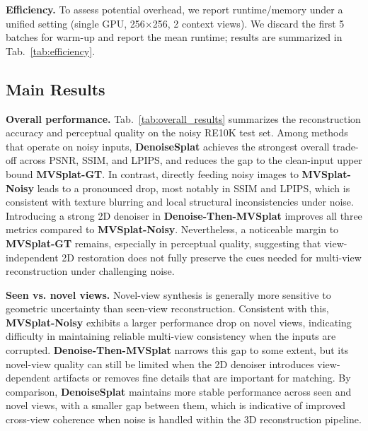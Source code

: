\noindent \textbf{Efficiency.}
To assess potential overhead, we report runtime/memory under a unified setting (single GPU, 256$\times$256, 2 context views).
We discard the first 5 batches for warm-up and report the mean runtime; results are summarized in Tab.~\ref{tab:efficiency}.










\subsection{Main Results}
\label{subsec:main_results}



\noindent \textbf{Overall performance.}
Tab.~\ref{tab:overall_results} summarizes the reconstruction accuracy and perceptual quality on the noisy RE10K test set.
Among methods that operate on noisy inputs, \textbf{DenoiseSplat} achieves the strongest overall trade-off across PSNR, SSIM, and LPIPS, and reduces the gap to the clean-input upper bound \textbf{MVSplat-GT}.
In contrast, directly feeding noisy images to \textbf{MVSplat-Noisy} leads to a pronounced drop, most notably in SSIM and LPIPS, which is consistent with texture blurring and local structural inconsistencies under noise.
Introducing a strong 2D denoiser in \textbf{Denoise-Then-MVSplat} improves all three metrics compared to \textbf{MVSplat-Noisy}.
Nevertheless, a noticeable margin to \textbf{MVSplat-GT} remains, especially in perceptual quality, suggesting that view-independent 2D restoration does not fully preserve the cues needed for multi-view reconstruction under challenging noise.

\noindent \textbf{Seen vs. novel views.}
Novel-view synthesis is generally more sensitive to geometric uncertainty than seen-view reconstruction.
Consistent with this, \textbf{MVSplat-Noisy} exhibits a larger performance drop on novel views, indicating difficulty in maintaining reliable multi-view consistency when the inputs are corrupted.
\textbf{Denoise-Then-MVSplat} narrows this gap to some extent, but its novel-view quality can still be limited when the 2D denoiser introduces view-dependent artifacts or removes fine details that are important for matching.
By comparison, \textbf{DenoiseSplat} maintains more stable performance across seen and novel views, with a smaller gap between them, which is indicative of improved cross-view coherence when noise is handled within the 3D reconstruction pipeline.

